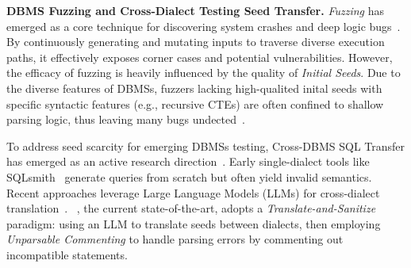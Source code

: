 \documentclass[sigconf,review,anonymous]{acmart}
\begin{document}

\textbf{DBMS Fuzzing and Cross-Dialect Testing Seed Transfer.} 
\textit{Fuzzing} has emerged as a core technique for discovering system crashes and deep logic bugs~\cite{jiang2023dynsql}. By continuously generating and mutating inputs to traverse diverse execution paths, it effectively exposes corner cases and potential vulnerabilities.
However, the efficacy of fuzzing is heavily influenced by the quality of \textit{Initial Seeds}. 
Due to the diverse features of DBMSs, fuzzers lacking high-qualited inital seeds with specific syntactic features (e.g., recursive CTEs) are often confined to shallow parsing logic, thus leaving many bugs undected~\cite{wang2021industry}.

To address seed scarcity for emerging DBMSs testing, Cross-DBMS SQL Transfer has emerged as an active research direction~\cite{zhou2020database}. Early single-dialect tools like SQLsmith~\cite{sqlsmith} generate queries from scratch but often yield invalid semantics. Recent approaches leverage Large Language Models (LLMs) for cross-dialect translation~\cite{deng2023large, zhang2023understanding}. \sedar{}~\cite{fu2024sedar}, the current state-of-the-art, adopts a \textit{Translate-and-Sanitize} paradigm: using an LLM to translate seeds between dialects, then employing \textit{Unparsable Commenting} to handle parsing errors by commenting out incompatible statements.
\end{document}
